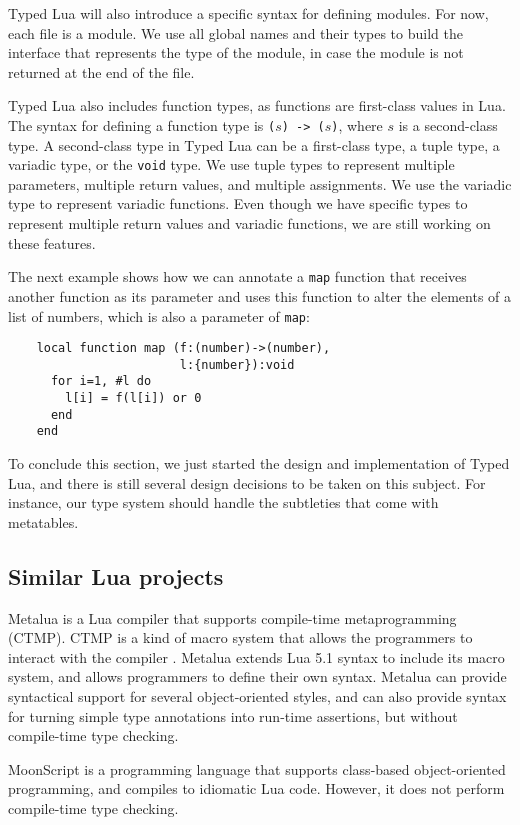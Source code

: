 \documentclass[preprint]{sig-alternate}
\begin{document}
Typed Lua will also introduce a specific syntax for defining modules.
For now, each file is a module.
We use all global names and their types to build the interface that
represents the type of the module, in case the module is not returned
at the end of the file.

Typed Lua also includes function types, as functions are first-class
values in Lua.
The syntax for defining a function type is \verb'('$s$\verb') -> ('$s$\verb')',
where $s$ is a second-class type.
A second-class type in Typed Lua can be a first-class type, a
tuple type, a variadic type, or the \verb'void' type.
We use tuple types to represent multiple parameters, multiple return
values, and multiple assignments.
We use the variadic type to represent variadic functions.
Even though we have specific types to represent multiple return values
and variadic functions, we are still working on these features.

The next example shows how we can annotate a \verb'map' function
that receives another function as its parameter and uses this
function to alter the elements of a list of numbers, which is
also a parameter of \verb'map':
\begin{verbatim}
    local function map (f:(number)->(number),
                        l:{number}):void
      for i=1, #l do
        l[i] = f(l[i]) or 0
      end
    end
\end{verbatim}

To conclude this section, we just started the design and
implementation of Typed Lua, and there is still several design
decisions to be taken on this subject.
For instance, our type system should handle the subtleties that
come with metatables.

\subsection{Similar Lua projects}

Metalua \cite{metalua} is a Lua compiler that supports compile-time
metaprogramming (CTMP).
CTMP is a kind of macro system that allows the programmers to interact
with the compiler \cite{fleutot2007contrasting}. 
Metalua extends Lua 5.1 syntax to include its macro system,
and allows programmers to define their own syntax.
Metalua can provide syntactical support for several object-oriented
styles, and can also provide syntax for turning simple type
annotations into run-time assertions, but without compile-time type
checking.

MoonScript \cite{moonscript} is a programming language that supports
class-based object-oriented programming, and compiles to idiomatic
Lua code.
However, it does not perform compile-time type checking.
\end{document}
